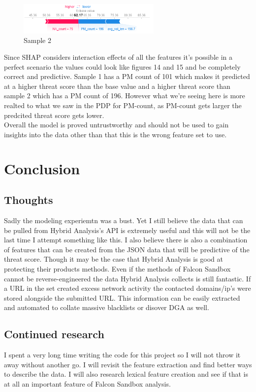 \documentclass[conference]{IEEEtran}
\begin{document}
\begin{figure}[h]
\centerline{\includegraphics[width=2.75in, height=.75in]{shampsamp2.PNG}}
\caption{Sample 2}
\label{fig}
\end{figure}

Since SHAP considers interaction effects of all the features it's possible in a perfect scenario the values could look like figures 14 and 15 and be completely correct and predictive. Sample 1 has a PM count of 101 which makes it predicted at a higher threat score than the base value and a higher threat score than sample 2 which has a PM count of 196. However what we're seeing here is more realted to what we saw in the PDP for PM-count, as PM-count gets larger the predcited threat score gets lower.\\

Overall the model is proved untrustworthy and should not be used to gain insights into the data other than that this is the wrong feature set to use.

\section{Conclusion}
\subsection{Thoughts}
Sadly the modeling experiemtn was a bust. Yet I still believe the data that can be pulled from Hybrid Analysis's API is extremely useful and this will not be the last time I attempt something like this. I also believe there is also a combination of features that can be created from the JSON data that will be predictive of the threat score. Though it may be the case that Hybrid Analysis is good at protecting their products methods. Even if the methods of Falcon Sandbox cannot be reverse-engineered the data Hybrid Analysis collects is still fantastic. If a URL in the set created excess network activity the contacted domains/ip's were stored alongside the submitted URL. This information can be easily extracted and automated to collate massive blacklists or disover DGA as well.
\subsection{Continued research}
I spent a very long time writing the code for this project so I will not throw it away without another go. I will revisit the feature extraction and find better ways to describe the data. I will also research lexical feature creation and see if that is at all an important feature of Falcon Sandbox analysis.
\end{document}
